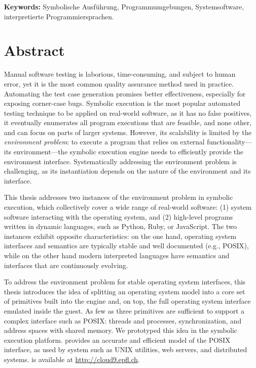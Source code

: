 \noindent \textbf{Keywords:} Symbolische Ausführung, Programmumgebungen, Systemsoftware, interpretierte Programmiersprachen.

\chapter*{Abstract}

Manual software testing is laborious, time-consuming, and subject to human error, yet it is the most common quality assurance method used in practice.
%
Automating the test case generation promises better effectiveness, especially for exposing corner-case bugs.
%
Symbolic execution is the most popular automated testing technique to be applied on real-world software, as it has no false positives, it eventually enumerates all program executions that are feasible, and none other, and can focus on parts of larger systems.
%
However, its scalability is limited by the \emph{environment problem}: to execute a program that relies on external functionality---its environment---the symbolic execution engine needs to efficiently provide the environment interface.
%
Systematically addressing the environment problem is challenging, as its instantiation depends on the nature of the environment and its interface.

This thesis addresses two instances of the environment problem in symbolic execution, which collectively cover a wide range of real-world software: (1) system software interacting with the operating system, and (2) high-level programs written in dynamic languages, such as Python, Ruby, or JavaScript.
%
The two instances exhibit opposite characteristics: on the one hand, operating system interfaces and semantics are typically stable and well documented (e.g., POSIX), while on the other hand modern interpreted languages have semantics and interfaces that are continuously evolving.

To address the environment problem for stable operating system interfaces, this thesis introduces the idea of splitting an operating system model into a core set of primitives built into the engine and, on top, the full operating system interface emulated inside the guest.
%
As few as three primitives are sufficient to support a complex interface such as POSIX: threads and processes, synchronization, and address spaces with shared memory.
%
We prototyped this idea in the \emph{\cnine} symbolic execution platform. \cnine provides an accurate and efficient model of the POSIX interface, as used by system such as UNIX utilities, web servers, and distributed systems.
%
\cnine is available at {\url{http://cloud9.epfl.ch}}.

